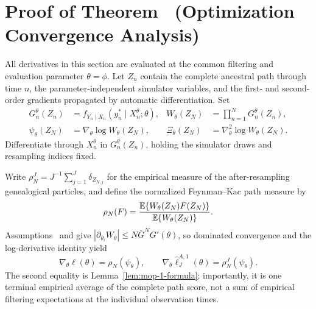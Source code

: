 \section[Linear Convergence of Warm-Started Score Optimization]{Proof of Theorem~{\thmMopConvergence} (Optimization Convergence Analysis)}
\label{sec:app07-s2}
\label{appendix:convergence}

All derivatives in this section are evaluated at the common filtering and
evaluation parameter $\theta=\phi$.  Let $Z_n$ contain the complete ancestral
path through time $n$, the parameter-independent simulator variables, and the
first- and second-order gradients propagated by automatic differentiation.  Set
\begin{align}
G_n^\theta(Z_n)
  &=f_{Y_n\mid X_n}(y_n^*\mid X_n^\theta;\theta),
&W_\theta(Z_N)&=\prod_{n=1}^N G_n^\theta(Z_n),                 \label{eq:s2-weight}\\
\psi_\theta(Z_N)
  &=\nabla_\theta\log W_\theta(Z_N),
&\Xi_\theta(Z_N)&=\nabla_\theta^2
                         \log W_\theta(Z_N).                  \label{eq:s2-score-curvature}
\end{align}
Differentiate through $X_n^\theta$ in $G_n^\theta(Z_n)$, holding the
simulator draws and resampling indices fixed.

Write $\rho_N^J=J^{-1}\sum_{j=1}^J\delta_{Z_{N,j}}$ for the empirical measure
of the after-resampling genealogical particles, and define the normalized
Feynman--Kac path measure by
\begin{equation}
\rho_N(F)=\frac{\mathbb{E}\{W_\theta(Z_N)F(Z_N)\}}
                 {\mathbb{E}\{W_\theta(Z_N)\}}.
\label{eq:s2-rho-definition}
\end{equation}
Assumptions~{} and
{} give
$|\partial_{\theta_i}W_\theta|\leq N\bar G^NG'(\theta)$, so dominated
convergence and the log-derivative identity yield
\begin{equation}
\nabla_\theta\ell(\theta)=\rho_N(\psi_\theta),
\qquad
\nabla_\theta\hat\ell_J^{A,1}(\theta)=\rho_N^J(\psi_\theta).
\label{eq:s2-gradient-identities}
\end{equation}
The second equality is Lemma~\ref{lem:mop-1-formula}; importantly, it is one
terminal empirical average of the complete path score, not a sum of empirical
filtering expectations at the individual observation times.

